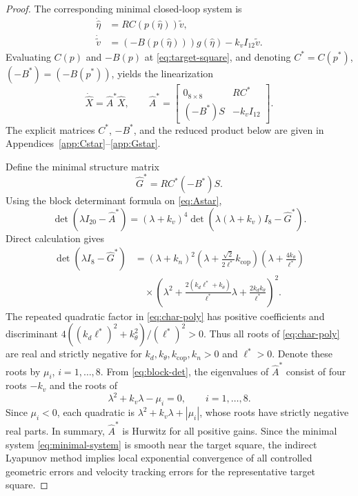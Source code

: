 \documentclass[letterpaper,journal]{IEEEtran}
\theoremstyle{plain}
\theoremstyle{definition}
\theoremstyle{remark}
\begin{document}
\begin{proof}
The corresponding minimal closed-loop system is
\begin{equation}
\begin{aligned}
\dot{\hat\eta}&=RC(p(\hat\eta))\tilde v,\\
\dot{\tilde v}&=(-B(p(\hat\eta)))g(\hat\eta)-k_vI_{12}\tilde v.
\end{aligned}
\label{eq:minimal-system}
\end{equation}
Evaluating \(C(p)\) and \(-B(p)\) at \eqref{eq:target-square}, and denoting \(C^*=C(p^*)\), \((-B^*)=(-B(p^*))\), yields the linearization
\begin{equation}
\dot{\hat X}=\hat A^*\hat X,
\qquad
\hat A^*=
\begin{bmatrix}
0_{8\times8} & RC^*\\
(-B^*)S & -k_vI_{12}
\end{bmatrix}.
\label{eq:Astar}
\end{equation}
The explicit matrices \(C^*\), \(-B^*\), and the reduced product below are given in Appendices~\ref{app:Cstar}--\ref{app:Gstar}.

Define the minimal structure matrix
\begin{equation}
\hat G^*=RC^*(-B^*)S.
\label{eq:Gstar-def}
\end{equation}
Using the block determinant formula on \eqref{eq:Astar},
\begin{equation}
\det(\lambda I_{20}-\hat A^*)=(\lambda+k_v)^4
\det\!\left(\lambda(\lambda+k_v)I_8-\hat G^*\right).
\label{eq:block-det}
\end{equation}
Direct calculation gives
\begin{equation}
\begin{aligned}
\det(\lambda I_8-\hat G^*)
&=(\lambda+k_n)^2
\left(\lambda+\frac{\sqrt2}{2\ell^*}k_{\mathrm{cop}}\right)
\left(\lambda+\frac{4k_\theta}{\ell^*}\right)\\
&\quad\times
\left(\lambda^2+\frac{2(k_d\ell^*+k_\theta)}{\ell^*}\lambda
+\frac{2k_dk_\theta}{\ell^*}\right)^2.
\end{aligned}
\label{eq:char-poly}
\end{equation}
The repeated quadratic factor in \eqref{eq:char-poly} has positive coefficients and discriminant \(4((k_d\ell^*)^2+k_\theta^2)/(\ell^*)^2>0\). Thus all roots of \eqref{eq:char-poly} are real and strictly negative for \(k_d,k_\theta,k_{\mathrm{cop}},k_n>0\) and \(\ell^*>0\). Denote these roots by \(\mu_i\), \(i=1,\ldots,8\). From \eqref{eq:block-det}, the eigenvalues of \(\hat A^*\) consist of four roots \(-k_v\) and the roots of
\[
\lambda^2+k_v\lambda-\mu_i=0,
\qquad i=1,\ldots,8.
\]
Since \(\mu_i<0\), each quadratic is \(\lambda^2+k_v\lambda+|\mu_i|\), whose roots have strictly negative real parts. In summary, \(\hat A^*\) is Hurwitz for all positive gains. Since the minimal system \eqref{eq:minimal-system} is smooth near the target square, the indirect Lyapunov method implies local exponential convergence of all controlled geometric errors and velocity tracking errors for the representative target square.


\end{proof}
\end{document}
